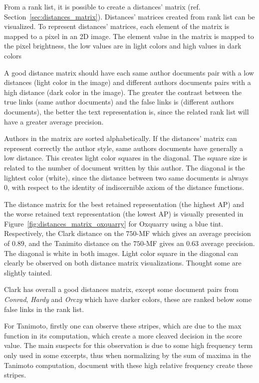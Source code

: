 From a rank list, it is possible to create a distances' matrix (ref. Section~\ref{sec:distances_matrix}).
Distances' matrices created from rank list can be visualized.
To represent distances' matrices, each element of the matrix is mapped to a pixel in an 2D image.
The element value in the matrix is mapped to the pixel brightness, the low values are in light colors and high values in dark colors

A good distance matrix should have each same author documents pair with a low distances (light color in the image) and different authors documents pairs with a high distance (dark color in the image).
The greater the contrast between the true links (same author documents) and the false links is (different authors documents), the better the text representation is, since the related rank list will have a greater average precision.

Authors in the matrix are sorted alphabetically.
If the distances' matrix can represent correctly the author style, same authors documents have generally a low distance.
This creates light color squares in the diagonal.
The square size is related to the number of document written by this author.
The diagonal is the lightest color (white), since the distance between two same documents is always 0, with respect to the identity of indiscernible axiom of the distance functions.

The distance matrix for the best retained representation (the highest AP) and the worse retained text representation (the lowest AP) is visually presented in Figure~\ref{fig:distances_matrix_oxquarry} for Oxquarry using a blue tint.
Respectively, the Clark distance on the $750$-MF which gives an average precision of $0.89$, and the Tanimito distance on the $750$-MF gives an $0.63$ average precision.
The diagonal is white in both images.
Light color square in the diagonal can clearly be observed on both distance matrix visualizations.
Thought some are slightly tainted.

Clark has overall a good distances matrix, except some document pairs from \textit{Conrad}, \textit{Hardy} and \textit{Orczy} which have darker colors, these are ranked below some false links in the rank list.

For Tanimoto, firstly one can observe these stripes, which are due to the max function in its computation, which create a more cleaved decision in the score value.
The main suspects for this observation is due to some high frequency term only used in some excerpts, thus when normalizing by the sum of maxima in the Tanimoto computation, document with these high relative frequency create these stripes.

